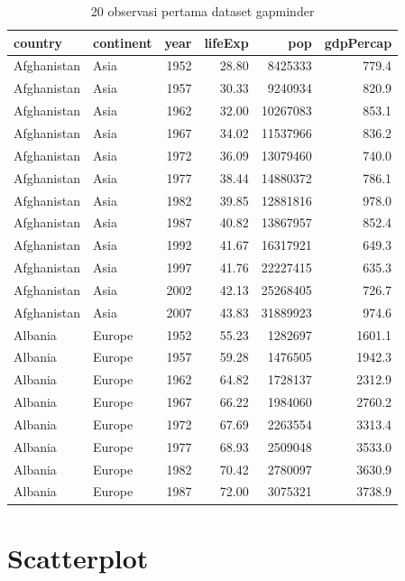 \documentclass[]{book}
\begin{document}
\begin{table}[t]

\caption{\label{tab:gapminder}20 observasi pertama dataset gapminder}
\centering
\begin{tabular}{l|l|r|r|r|r}
\hline
country & continent & year & lifeExp & pop & gdpPercap\\
\hline
Afghanistan & Asia & 1952 & 28.80 & 8425333 & 779.4\\
\hline
Afghanistan & Asia & 1957 & 30.33 & 9240934 & 820.9\\
\hline
Afghanistan & Asia & 1962 & 32.00 & 10267083 & 853.1\\
\hline
Afghanistan & Asia & 1967 & 34.02 & 11537966 & 836.2\\
\hline
Afghanistan & Asia & 1972 & 36.09 & 13079460 & 740.0\\
\hline
Afghanistan & Asia & 1977 & 38.44 & 14880372 & 786.1\\
\hline
Afghanistan & Asia & 1982 & 39.85 & 12881816 & 978.0\\
\hline
Afghanistan & Asia & 1987 & 40.82 & 13867957 & 852.4\\
\hline
Afghanistan & Asia & 1992 & 41.67 & 16317921 & 649.3\\
\hline
Afghanistan & Asia & 1997 & 41.76 & 22227415 & 635.3\\
\hline
Afghanistan & Asia & 2002 & 42.13 & 25268405 & 726.7\\
\hline
Afghanistan & Asia & 2007 & 43.83 & 31889923 & 974.6\\
\hline
Albania & Europe & 1952 & 55.23 & 1282697 & 1601.1\\
\hline
Albania & Europe & 1957 & 59.28 & 1476505 & 1942.3\\
\hline
Albania & Europe & 1962 & 64.82 & 1728137 & 2312.9\\
\hline
Albania & Europe & 1967 & 66.22 & 1984060 & 2760.2\\
\hline
Albania & Europe & 1972 & 67.69 & 2263554 & 3313.4\\
\hline
Albania & Europe & 1977 & 68.93 & 2509048 & 3533.0\\
\hline
Albania & Europe & 1982 & 70.42 & 2780097 & 3630.9\\
\hline
Albania & Europe & 1987 & 72.00 & 3075321 & 3738.9\\
\hline
\end{tabular}
\end{table}

\section{Scatterplot}\label{scatterplot}
\end{document}
